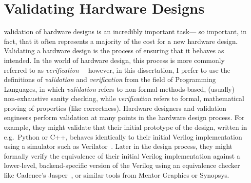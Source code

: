 
\section{Validating Hardware Designs}

\Gls{validation} of hardware designs
  is an incredibly important task---%
  so important, in fact, that it often represents
  a majority of the cost
  for a new hardware design.
Validating a hardware design
  is the process of ensuring
  that it behaves as intended.
In the world of hardware design,
  this process is more commonly
  referred to as
  \textit{verification---}%
  however, in this dissertation,
  I prefer to use the definitions
  of \textit{validation} and \textit{verification}
  from the field of Programming Languages,
  in which \textit{validation}
  refers to non-formal-methods-based,
  (usually) non-exhaustive sanity checking,
  while \textit{verification}
  refers to formal, mathematical
  proving of properties (like correctness).
Hardware designers and validation engineers
  perform validation
  at many points in the hardware design process.
For example,
  they might validate that
  their initial prototype of the design,
  written in e.g.~Python or C++,
  behaves identically to their
  initial Verilog implementation
  using a simulator
  such as Verilator~\cite{verilator}.
Later in the design process,
  they might
  formally verify the equivalence
  of their initial Verilog implementation
  against a lower-level,
  backend-specific version of the Verilog
  using an equivalence checker
  like Cadence's Jasper~\cite{jasper},
  or similar tools from Mentor Graphics
  or Synopsys.


